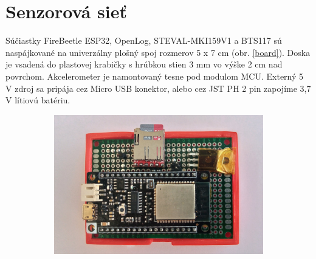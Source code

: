 \section{Senzorová sieť}
Súčiastky FireBeetle ESP32, OpenLog, STEVAL-MKI159V1 a BTS117 sú naspájkované na univerzálny plošný spoj rozmerov 5 x 7 cm
(obr. \ref{board}). Doska je vsadená do plastovej krabičky s hrúbkou stien 3 mm vo výške 2 cm nad povrchom.
Akcelerometer je namontovaný tesne pod modulom MCU. Externý 5 V zdroj sa pripája cez Micro USB konektor, alebo cez JST PH
2 pin zapojíme 3,7 V lítiovú batériu.
\begin{figure}[h!]
\centering
\begin{subfigure}{0.6\textwidth}
    \centering
    \includegraphics[width=\textwidth]{figures/design/esp32.jpg}
\end{subfigure}
\begin{subfigure}{0.2\textwidth}
    \centering

\end{subfigure}
\end{figure}
